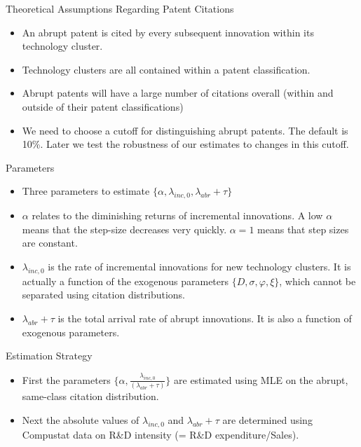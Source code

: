 \documentclass[11pt]{beamer}
\begin{document}
\begin{frame}{Theoretical Assumptions Regarding Patent Citations}
	\begin{itemize}\itemsep12pt	
		\item An abrupt patent is cited by every subsequent innovation within its technology cluster.
		\item Technology clusters are all contained within a patent classification.
		\item Abrupt patents will have a large number of citations overall (within and outside of their patent classifications)
		\item We need to choose a cutoff for distinguishing abrupt patents. The default is 10\%. Later we test the robustness of our estimates to changes in this cutoff.
	\end{itemize}
\end{frame}

\begin{frame} {Parameters}
	\begin{itemize}\itemsep 12pt
		\item Three parameters to estimate $\{\alpha , \lambda_{inc, 0}, \lambda_{abr} + \tau \}$
		\item $\alpha$ relates to the diminishing returns of incremental innovations. A low $\alpha$ means that the step-size decreases very quickly. $\alpha = 1$ means that step sizes are constant.
		\item $\lambda_{inc, 0}$ is the rate of incremental innovations for new technology clusters. It is actually a function of the exogenous parameters $\{D, \sigma, \varphi, \xi\}$, which cannot be separated using citation distributions.
		\item $\lambda_{abr} + \tau$ is the total arrival rate of abrupt innovations. It is also a function of exogenous parameters.
	\end{itemize}
\end{frame}

\begin{frame} {Estimation Strategy}
	\begin{itemize}\itemsep 12pt
		\item First the parameters $\{\alpha,\frac{\lambda_{inc, 0}}{(\lambda_{abr} + \tau)} \}$ are estimated using MLE on the abrupt, same-class citation distribution.
		\item Next the absolute values of $\lambda_{inc, 0}$ and $\lambda_{abr} + \tau$ are determined using Compustat data on R\&D intensity (= R\&D expenditure/Sales).
	\end{itemize}
\end{frame}
\end{document}
